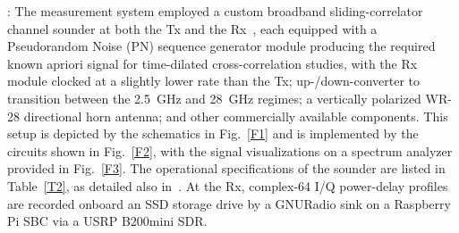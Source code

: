 \documentclass[12pt, draftcls, onecolumn]{IEEEtran}
\begin{document}
: The measurement system employed a custom broadband sliding-correlator channel sounder at both the Tx and the Rx~\cite{Purdue}, each equipped with a Pseudorandom Noise (PN) sequence generator module producing the required known apriori signal for time-dilated cross-correlation studies, with the Rx module clocked at a slightly lower rate than the Tx; up-/down-converter to transition between the \SI{2.5}{\giga\hertz} and \SI{28}{\giga\hertz} regimes; a vertically polarized WR-28 directional horn antenna; and other commercially available components. This setup is depicted by the schematics in Fig.~\ref{F1} and is implemented by the circuits shown in Fig.~\ref{F2}, with the signal visualizations on a spectrum analyzer provided in Fig.~\ref{F3}. The operational specifications of the sounder are listed in Table~\ref{T2}, as detailed also in~\cite{Purdue}. At the Rx, complex-\SI{64}{} I/Q power-delay profiles are recorded onboard an SSD storage drive by a GNURadio sink on a Raspberry Pi SBC via a USRP B$200$mini SDR.
\end{document}
